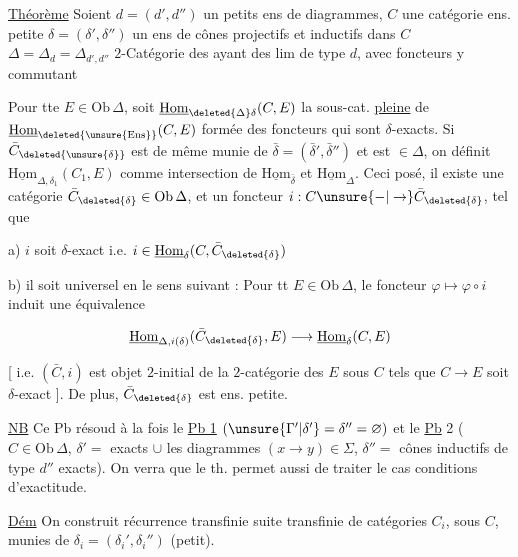 

\uline{Théorème} Soient $d=(d',d'')$ un  petits ens de diagrammes, $C$ une catégorie ens. petite $\delta=(\delta',\delta'')$ un  ens de cônes projectifs et inductifs dans $C$ $\Delta=\Delta_d=\Delta_{d',d''}$ $2$-Catégorie des  ayant des lim de type $d$, avec foncteurs y commutant


Pour tte $E\in\mathrm{Ob}\,\Delta$, soit $\underline{\mathrm{Hom}}_{\deleted{\Delta}\delta}(C,E)$ la sous-cat. \uline{pleine} de $\underline{\mathrm{Hom}}_{\deleted{\unsure{\mathrm{Ens}}}}(C,E)$ formée des foncteurs qui sont $\delta$-exacts. Si $\bar C_{\deleted{\unsure{\delta}}}$ est de même munie de $\bar\delta=(\bar\delta',\bar\delta'')$ et est $\in\Delta$, on définit $\underline{\mathrm{Hom}}_{\Delta,\delta_1}(C_1,E)$ comme intersection de $\underline{\mathrm{Hom}}_{\bar\delta}$ et $\underline{\mathrm{Hom}}_\Delta$. Ceci posé, il existe une catégorie $\bar C_{\deleted{\delta}}\in\mathrm{Ob}\,\Delta$, et un foncteur $i:C\unsure{-|\to}\bar C_{\deleted{\delta}}$, tel que

a) $i$ soit $\delta$-exact i.e. $i\in\underline{\mathrm{Hom}}_\delta(C,\bar C_{\deleted{\delta}})$

b) il soit universel en le sens suivant : Pour tt $E\in\mathrm{Ob}\,\Delta$, le foncteur $\varphi\longmapsto\varphi\circ i$ induit une équivalence

\[
\underline{\mathrm{Hom}}_{\Delta,i(\delta)}(\bar C_{\deleted{\delta}},E)\longrightarrow\underline{\mathrm{Hom}}_\delta(C,E)
\]

[ i.e. $(\bar C,i)$ est objet $2$-initial de la $2$-catégorie des $E$  sous $C$ tels que $C\to E$ soit $\delta$-exact ]. De plus, $\bar C_{\deleted{\delta}}$ est ens. petite.

\uline{NB} Ce Pb résoud à la fois le \uline{Pb 1} $(\unsure{\Gamma'|\delta'}=\delta''=\varnothing)$ et le \uline{Pb} 2 ($C\in\mathrm{Ob}\,\Delta$,  $\delta'=$   exacts  $\cup$ les diagrammes $(x\to y)\in\Sigma$, $\delta''=$  cônes inductifs de type $d''$ exacts). On verra que le th. permet aussi de traiter le cas  conditions d'exactitude.

\uline{Dém} On construit   récurrence transfinie  suite transfinie de  catégories $C_i$, sous $C$, munies de $\delta_i=(\delta_i',\delta_i'')$ (petit).

